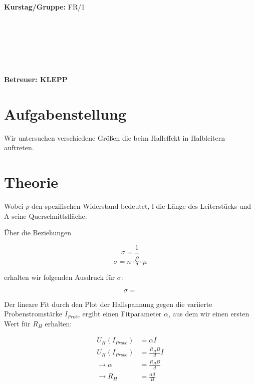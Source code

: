 \documentclass[12pt,a4paper,twopage]{article}
\begin{document}
\begin{verbatim}


\end{verbatim}
			\begin{flushleft}
			\textbf{\Large{Kurstag/Gruppe:}} \Large{FR/1}
			\end{flushleft}

\begin{verbatim}






\end{verbatim}
			\begin{flushleft}
			\LARGE{\textbf{Betreuer:\Large{ KLEPP }}}		
			\end{flushleft}
			
\pagebreak			
			
\section{Aufgabenstellung}
Wir untersuchen verschiedene Größen die beim Halleffekt in Halbleitern auftreten.
\section{Theorie}

Wobei $\rho$ den spezifischen Widerstand bedeutet, l die Länge des Leiterstücks und A seine Querschnittsfläche.

Über die Beziehungen

$$ \sigma = \frac{1}{\rho} $$
$$ \sigma = n \cdot q \cdot \mu $$

erhalten wir folgenden Ausdruck für $\sigma$:

$$ \sigma = $$


Der lineare Fit durch den Plot der Hallspannung gegen die variierte Probenstromstärke $I_{Probe}$ ergibt einen Fitparameter $\alpha$, aus dem wir einen ersten Wert für $R_H$ erhalten:

\begin{equation}
\label{afit}
\begin{split}
U_H(I_{Probe})& = \alpha I \\
U_H(I_{Probe})& = \frac{R_H B}{d} I \\
\rightarrow \alpha & = \frac{R_H B}{d} \\
\rightarrow R_H & = \frac{\alpha d}{B}
\end{split}
\end{equation}
\end{document}
